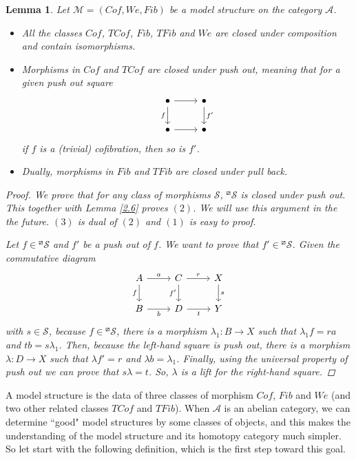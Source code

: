 \documentclass[12pt]{amsart}
\numberwithin{equation}{section}
\newtheorem{lemma}{Lemma}[section]
\theoremstyle{definition}
\newtheorem*{theorem 0*}{Theorem}
\newtheorem*{theorem a*}{Theorem A}
\newtheorem*{theorem b*}{Theorem B}
\newcounter{diagram}
\numberwithin{diagram}{section}
\begin{document}
\begin{lemma}\label{2.7}
Let $\mathcal{M}=(Cof,We,Fib)$ be a model structure on the category $\mathcal{A}$.
		\begin{itemize}
		\item[(1)]
		All the classes $Cof$, $TCof$, $Fib$, $TFib$ and $We$ are closed under composition and contain isomorphisms.
		\item[(2)]
		Morphisms in $Cof$ and $TCof$ are closed under push out, meaning that for a given push out square
		\[\begin{tikzcd}
	    \bullet & \bullet \\
	    \bullet & \bullet
	    \arrow[from=1-1, to=1-2]
	    \arrow["f"', from=1-1, to=2-1]
	    \arrow["{f'}", from=1-2, to=2-2]
	    \arrow[from=2-1, to=2-2]
        \end{tikzcd}\]
        if $f$ is a (trivial) cofibration, then so is $f'$.
		\item[(3)]
		Dually, morphisms in $Fib$ and $TFib$ are closed under pull back.
		\end{itemize}
	\begin{proof}
	We prove that for any class of morphisms $\mathcal{S}$, ${}^{\boxslash}\mathcal{S}$ is closed under push out. This together with Lemma \ref{2.6} proves $(2)$. We will use this argument in the the future. $(3)$ is dual of $(2)$ and $(1)$ is easy to proof.
	
	Let $f\in{}^{\boxslash}\mathcal{S}$ and $f'$ be a push out of $f$. We want to prove that $f'\in{}^{\boxslash}\mathcal{S}$. Given the commutative diagram
	\[\begin{tikzcd}
	A & C & X \\
	B & D & Y
	\arrow["a", from=1-1, to=1-2]
	\arrow["f"', from=1-1, to=2-1]
	\arrow["r", from=1-2, to=1-3]
	\arrow["{f'}"', from=1-2, to=2-2]
	\arrow["s", from=1-3, to=2-3]
	\arrow["b"', from=2-1, to=2-2]
	\arrow["t"', from=2-2, to=2-3]
\end{tikzcd}\]
with $s\in\mathcal{S}$, because $f\in {}^{\boxslash}\mathcal{S}$, there is a morphism $\lambda_1:B\rightarrow X$ such that $\lambda_1 f=ra$ and $tb=s\lambda_1$.
Then, because the left-hand square is push out, there is a morphism $\lambda:D\rightarrow X$ such that $\lambda f'=r$ and $\lambda b=\lambda_1$. Finally, using the universal property of push out we can prove that $s\lambda=t$. So, $\lambda$ is a lift for the right-hand square.
\end{proof}
\end{lemma}
	
A model structure is the data of three classes of morphism $Cof$, $Fib$ and $We$ (and two other related classes $TCof$ and $TFib$). When $\mathcal{A}$ is an abelian category, we can determine “good" model structures by some classes of objects, and this makes the understanding of the model structure and its homotopy category much simpler.
So let start with the following definition, which is the first step toward this goal.
	
\end{document}

